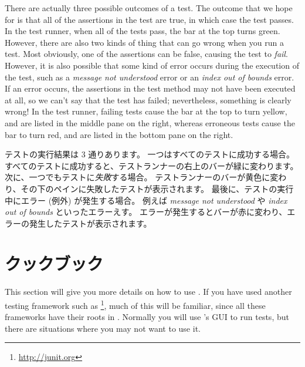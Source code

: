 \documentclass[a4paper,10pt,twoside]{book}
\begin{document}
{
There are actually three possible outcomes of a test.
The outcome that we hope for is that all of the assertions in the test are true, in which case the test passes.
In the test runner, when all of the tests pass, the bar at the top turns green.
However, there are also two kinds of thing that can go wrong when
you run a test.
Most obviously, one of the assertions can be false, causing the test to \emph{fail}.
However, it is also possible that some kind of error occurs during the execution of the test, such as a \emph{message not understood} error or an \emph{index out of bounds} error.
If an error occurs, the assertions in the test method may not have been executed at all,
so we can't say that the test has failed; nevertheless, something is clearly wrong!
In the {test runner}, failing tests cause the bar at the top to turn yellow, and are listed in the middle pane on the right, whereas erroneous tests cause the bar to turn red, and are listed in the bottom pane on the right.
\fi


テストの実行結果は 3 通りあります。
一つはすべてのテストに成功する場合。
すべてのテストに成功すると、{テストランナー}の右上のバーが緑に変わります。
次に、一つでもテストに\emph{失敗}する場合。
{テストランナー}のバーが黄色に変わり、その下のペインに失敗したテストが表示されます。
最後に、テストの実行中にエラー (例外) が発生する場合。
例えば \emph{message not understood} や \emph{index out of bounds} といったエラーえす。
エラーが発生するとバーが赤に変わり、エラーの発生したテストが表示されます。



\section{\SUnit クックブック}

This section will give you more details on how to use \SUnit.  If you
have used another testing framework such as \JUnit\footnote{\url{http://junit.org}},
much of this will be familiar, since all these frameworks have their roots in \SUnit.
Normally you will use \SUnit's GUI to run tests, but there are
situations where you may not want to use it.
\fi

}
\end{document}
